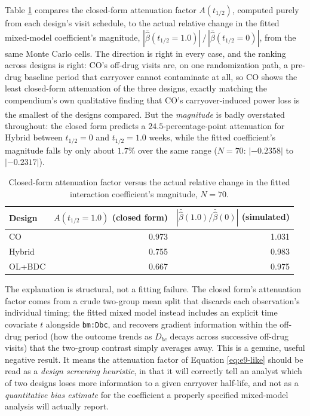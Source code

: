 \documentclass[
  11pt,
]{article}
\begin{document}
Table \ref{tab:attenuation} compares the closed-form attenuation
factor \(A(t_{1/2})\), computed purely from each design's visit
schedule, to the actual relative change in the fitted mixed-model
coefficient's magnitude, \(|\overline{\hat\beta}(t_{1/2}{=}1.0)| \,/\,
|\overline{\hat\beta}(t_{1/2}{=}0)|\), from the same Monte Carlo cells.
The direction is right in every case, and the ranking across designs
is right: CO's off-drug visits are, on one randomization path, a
pre-drug baseline period that carryover cannot contaminate at all, so
CO shows the least closed-form attenuation of the three designs,
exactly matching the compendium's own qualitative finding that CO's
carryover-induced power loss is the smallest of the designs compared\textsuperscript{}. But the \emph{magnitude} is badly overstated
throughout: the closed form predicts a
\(24.5\)-percentage-point
attenuation for Hybrid between \(t_{1/2}=0\) and \(t_{1/2}=1.0\) weeks,
while the fitted coefficient's magnitude falls by only about
\(1.7\%\)
over the same range (\(N=70\): \(|{-}0.2358|\) to
\(|{-}0.2317|\)).

\begin{table}[H]
\centering
\caption{Closed-form attenuation factor versus the actual relative change in the fitted interaction coefficient's magnitude, $N=70$.}
\label{tab:attenuation}

\begin{tabular}{lrr}
\toprule
Design & $A(t_{1/2}{=}1.0)$ (closed form) & $|\bar{\hat\beta}(1.0)/\bar{\hat\beta}(0)|$ (simulated)\\
\midrule
CO & 0.973 & 1.031\\
Hybrid & 0.755 & 0.983\\
OL+BDC & 0.667 & 0.975\\
\bottomrule
\end{tabular}
\end{table}

The explanation is structural, not a fitting failure. The closed
form's attenuation factor comes from a crude two-group mean split
that discards each observation's individual timing; the fitted mixed
model instead includes an explicit time covariate \(t\) alongside
\texttt{bm:Dbc}, and recovers gradient information within the off-drug
period (how the outcome trends as \(D_{bc}\) decays across successive
off-drug visits) that the two-group contrast simply averages away.
This is a genuine, useful negative result. It means the
attenuation factor of Equation \eqref{eq:e9-like} should be read
as a \emph{design screening heuristic}, in that it will correctly tell
an analyst which of two designs loses more information to a
given carryover half-life, and not as a \emph{quantitative bias
estimate} for the coefficient a properly specified mixed-model
analysis will actually report.
\end{document}
